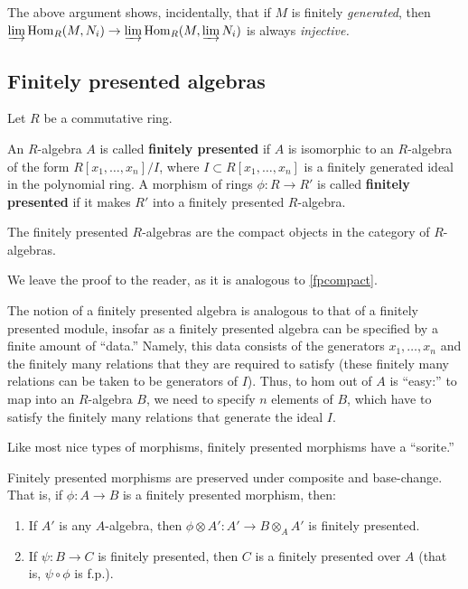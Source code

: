 The above argument shows, incidentally, that if $M$ is finitely
\emph{generated}, then 
$\varinjlim \hom_R(M, N_i) \to \varinjlim \hom_R( M, \varinjlim N_i)  $ is
always \emph{injective.}


\subsection{Finitely presented algebras}

Let $R$ be a commutative ring.
\begin{definition} 
An $R$-algebra $A$ is called \textbf{finitely presented} if $A$ is isomorphic
to an $R$-algebra of the form $R[x_1, \dots, x_n]/I$, where $I \subset R[x_1,
\dots, x_n]$ is a finitely generated ideal in the polynomial ring.
A morphism of rings $\phi: R \to R'$ is called \textbf{finitely presented} if
it makes $R'$ into a finitely presented $R$-algebra.
\end{definition} 

\begin{proposition} 
The finitely presented $R$-algebras are the compact objects in the category of
$R$-algebras.
\end{proposition} 
We leave the proof to the reader, as it is analogous to \cref{fpcompact}.

The notion of a finitely presented algebra is analogous to that of a finitely
presented module, insofar as a finitely presented algebra can be specified by a
finite amount of ``data.''
Namely, this data consists of the generators $x_1, \dots, x_n$ and the
finitely many relations that they are required to satisfy (these finitely
many relations can be taken to be generators of $I$).
Thus, to hom out of $A$ is ``easy:'' to map into an $R$-algebra $B$, we need
to specify $n$ elements of $B$, which have to satisfy the finitely many
relations that generate the ideal $I$.


Like most nice types of morphisms, finitely presented morphisms have a
``sorite.''
\begin{proposition}
Finitely presented morphisms are preserved under composite and base-change.
That is, if $\phi: A \to B$ is a finitely presented morphism, then:
\begin{enumerate}
\item If $A'$ is any $A$-algebra, then $\phi \otimes A': A' \to B \otimes_A
A'$ is finitely presented. 
\item If $\psi: B \to C$ is finitely presented, then $C$ is a finitely
presented over $A$ (that is, $\psi \circ \phi$ is f.p.).
\end{enumerate}
\end{proposition} 




